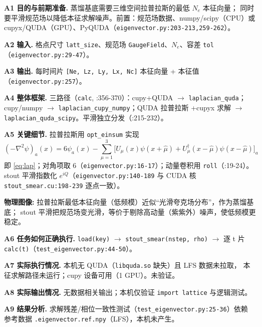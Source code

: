 \documentclass[UTF8]{ctexart}
\begin{document}
\textbf{A1 目的与前期准备.} 蒸馏基底需要三维空间拉普拉斯的最低 $N_e$ 本征向量；
同时要平滑规范场以降低本征求解噪声。前置：规范场数据、numpy/scipy（CPU）或
cupyx/QUDA（GPU）、PyQUDA（\texttt{\nolinkurl{eigenvector.py:203-213,259-262}}）。

\textbf{A2 输入.} 格点尺寸 \texttt{\nolinkurl{latt_size}}、规范场 \texttt{GaugeField}、$N_e$、容差
\texttt{tol}（\texttt{\nolinkurl{eigenvector.py:29-47}}）。

\textbf{A3 输出.} 每时间片 \texttt{[Ne, Lz, Ly, Lx, Nc]} 本征向量 + 本征值
（\texttt{\nolinkurl{eigenvector.py:257}}）。

\textbf{A4 整体框架.} 三路径（\texttt{calc}, :356-370）：cupy+QUDA $\to$
\texttt{\nolinkurl{laplacian_quda}}；cupy/numpy $\to$ \texttt{\nolinkurl{laplacian_cupy_numpy}}；QUDA 拉普拉斯
+cupyx 求解 $\to$ \texttt{\nolinkurl{laplacian_quda_scipy}}。平滑独立分发（:215-232）。

\textbf{A5 关键细节.} 拉普拉斯用 \texttt{\nolinkurl{opt_einsum}} 实现
\begin{equation}\label{eq:lap}
  (-\nabla^2\psi)_a(x) = 6\psi_a(x) - \sum_{\mu=1}^{3}\big[U_\mu(x)\psi(x+\hat\mu) + U_\mu^\dagger(x-\hat\mu)\psi(x-\hat\mu)\big]_a
\end{equation}
即 \eqref{eq:lap}；对角项取 6（\texttt{\nolinkurl{eigenvector.py:16-17}}）；动量卷积用
\texttt{roll}（:19-24）。stout 平滑指数化 $e^{iQ}$（\texttt{\nolinkurl{eigenvector.py:140-189}} 与
CUDA 核 \texttt{\nolinkurl{stout_smear.cu:198-239}} 逐点一致）。

\begin{physbox}
\textbf{物理图像:} 拉普拉斯最低本征向量（低频模）近似``光滑夸克场分布''，作为蒸馏基底；
stout 平滑把规范场变光滑，等价于剔除高动量（紫紫外）噪声，使低频模更稳定。
\end{physbox}

\textbf{A6 任务如何正确执行.} \texttt{load(key)} $\to$ \texttt{stout\_smear(nstep, rho)}
$\to$ 逐 t 片 \texttt{calc(t)}（\texttt{\nolinkurl{test_eigenvector.py:44-50}}）。

\textbf{A7 实际执行情况.} 本机无 QUDA（\texttt{\nolinkurl{libquda.so}} 缺失）且 LFS 数据未拉取，
本征求解路径未运行；cupy 设备可用（1 GPU）。\textcolor{warn}{未验证}。

\textbf{A8 实际输出情况.} 无数据相关输出；本机仅验证 \texttt{import lattice} 与逻辑测试。

\textbf{A9 结果分析.} 求解残差/相位一致性测试（\texttt{\nolinkurl{test_eigenvector.py:25-36}}）依赖
参考数据 \texttt{\nolinkurl{.eigenvector.ref.npy}}（LFS），本机未产生。
\end{document}
